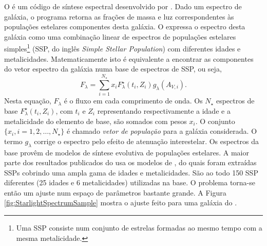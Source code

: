 O \starlight é um código de síntese espectral desenvolvido por
\citet{CidFernandes2005}. Dado um espectro de galáxia, o programa retorna as
frações de massa e luz correspondentes às populações estelares componentes desta
galáxia. O \starlight expressa o espectro desta galáxia como uma combinação
linear de espectros de populações estelares simples\footnote{Uma SSP consiste
num conjunto de estrelas formadas ao mesmo tempo com a mesma metalicidade.}
(SSP, do inglês {\em Simple Stellar Population}) com diferentes idades e
metalicidades. Matematicamente isto é equivalente a encontrar as componentes do
vetor espectro da galáxia numa base de espectros de SSP, ou seja,
\begin{equation*}
F_\lambda = \sum_{i=1}^{N_\star} x_i F^\star_\lambda(t_i,Z_i)
g_\lambda(A_{V,i}).
\end{equation*}
Nesta equação, $F_\lambda$ é o fluxo em cada comprimento de onda. Os $N_\star$
espectros de base $F^\star_\lambda(t_i, Z_i)$, com $t_i$ e $Z_i$ representando
respectivamente a idade e a metalicidade do elemento de base, são somados com
pesos $x_i$. O conjunto $\{x_i, i=1,2,\ldots,N_\star\}$ é chamado {\em vetor de
população} para a galáxia considerada. O termo $g_\lambda$ corrige o espectro
pelo efeito de atenuação interestelar. Os espectros da base provêm de modelos de
síntese evolutiva de populações estelares. A maior parte dos resultados
publicados do \starlight usa os modelos de \citet[BC03]{Bruzual2003}, do quais
foram extraídas SSPs cobrindo uma ampla gama de idades e metalicidades. São ao
todo 150 SSP diferentes (25 idades e 6 metalicidades) utilizadas na base. O
problema torna-se então um ajuste num espaço de parâmetros bastante grande. A
Figura \ref{fig:StarlightSpectrumSample} mostra o ajuste feito para uma galáxia
do \SDSS.

